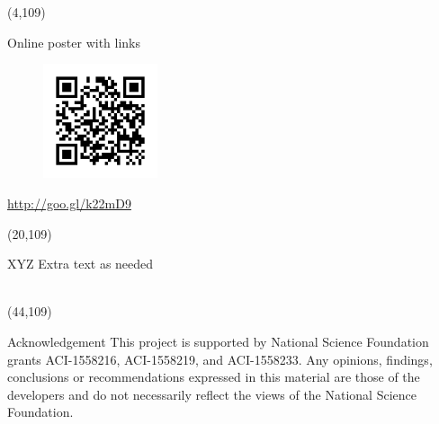 \documentclass[final]{beamer}
\begin{document}
\begin{frame}{}
\begin{textblock}{14.0}(4,109)
\begin{block}{Online poster with links}
\begin{figure}[tbph]
\centering
\includegraphics[width=0.30\textwidth]{images/qr-s2i2-hep-si2-pi-workshop-2017.png}
\end{figure}
\begin{center}
\url{http://goo.gl/k22mD9}
\end{center}
\end{block}
\end{textblock}


\begin{textblock}{22.0}(20,109)
\begin{block}{XYZ}
Extra text as needed
~~ \\
~~ \\
\end{block}
\end{textblock}



\begin{textblock}{38.0}(44,109)
\begin{block}{Acknowledgement}
This project is supported by National Science Foundation grants ACI-1558216, ACI-1558219, and ACI-1558233. Any opinions, findings, conclusions or recommendations expressed in this material are those of the developers and do not necessarily reflect the views of the National Science Foundation. \\

\end{block}
\end{textblock}




\end{frame}
\end{document}
